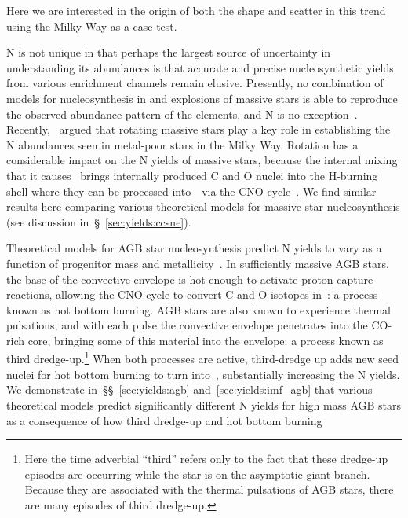 \documentclass[ms.tex]{subfiles}
\begin{document}
Here we are interested in the origin of both the shape and scatter in this
trend using the Milky Way as a case test.
\par
N is not unique in that perhaps the largest source of uncertainty in
understanding its abundances is that accurate and precise nucleosynthetic yields
from various enrichment channels remain elusive.
Presently, no combination of models for nucleosynthesis in and explosions of
massive stars is able to reproduce the observed abundance pattern of the
elements, and N is no exception~\citep{Griffith2021}.
Recently,~\citet*{Grisoni2021} argued that rotating massive stars play a key
role in establishing the N abundances seen in metal-poor stars in the Milky Way.
Rotation has a considerable impact on the N yields of massive stars, because the
internal mixing that it causes~\citep{Zahn1992, Maeder1998, Lagarde2012} brings
internally produced C and O nuclei into the H-burning shell where they can be
processed into~\Nfourteen~via the CNO cycle~\citep{Heger2010, Frischknecht2016,
Andrews2017}.
We find similar results here comparing various theoretical models for
massive star nucleosynthesis (see discussion in~\S~\ref{sec:yields:ccsne}).
\par
Theoretical models for AGB star nucleosynthesis predict N yields to vary as a
function of progenitor mass and metallicity~\citep{Cristallo2011, Cristallo2015,
Karakas2010, Karakas2016, Karakas2018, Ventura2013, Ventura2014, Ventura2018,
Ventura2020}.
In sufficiently massive AGB stars, the base of the convective envelope is hot
enough to activate proton capture reactions, allowing the CNO cycle to convert
C and O isotopes in~\Nfourteen: a process known as hot bottom burning.
AGB stars are also known to experience thermal pulsations, and with each pulse
the convective envelope penetrates into the CO-rich core, bringing some of this
material into the envelope: a process known as third dredge-up.\footnote{
	Here the time adverbial ``third'' refers only to the fact that these
	dredge-up episodes are occurring while the star is on the asymptotic giant
	branch. Because they are associated with the thermal pulsations of AGB
	stars, there are many episodes of third dredge-up.
}
When both processes are active, third-dredge up adds new seed nuclei for hot
bottom burning to turn into~\Nfourteen, substantially increasing the N yields.
We demonstrate in~\S\S~\ref{sec:yields:agb} and~\ref{sec:yields:imf_agb} that
various theoretical models predict significantly different N yields for high
mass AGB stars as a consequence of how third dredge-up and hot bottom burning
\end{document}
